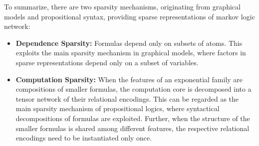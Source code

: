 
To summarize, there are two sparsity mechanisms, originating from graphical models and propositional syntax, providing sparse representations of markov logic network:
\begin{itemize}
	\item \textbf{Dependence Sparsity:} Formulas depend only on subsets of atoms.
		This exploits the main sparsity mechanism in graphical models, where factors in sparse representations depend only on a subset of variables.
	\item \textbf{Computation Sparsity:}
		When the features of an exponential family are compositions of smaller formulas, the computation core is decomposed into a tensor network of their relational encodings.
		This can be regarded as the main sparsity mechanism of propositional logics, where syntactical decompositions of formulas are exploited.
		Further, when the structure of the smaller formulas is shared among different features, the respective relational encodings need to be instantiated only once.
\end{itemize}










